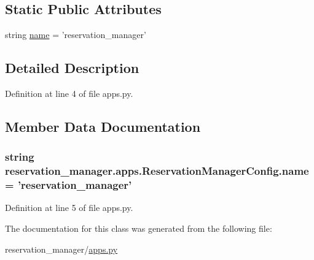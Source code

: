 \subsection*{Static Public Attributes}
\begin{DoxyCompactItemize}
\item 
string \hyperlink{classreservation__manager_1_1apps_1_1ReservationManagerConfig_a4c9b03084ec5d4aab257e52d0f51bf97}{name} = 'reservation\-\_\-manager'
\end{DoxyCompactItemize}


\subsection{Detailed Description}


Definition at line 4 of file apps.\-py.



\subsection{Member Data Documentation}
\hypertarget{classreservation__manager_1_1apps_1_1ReservationManagerConfig_a4c9b03084ec5d4aab257e52d0f51bf97}{
\subsubsection[{name}]{\setlength{\rightskip}{0pt plus 5cm}string reservation\-\_\-manager.\-apps.\-Reservation\-Manager\-Config.\-name = 'reservation\-\_\-manager'\hspace{0.3cm}{\ttfamily [static]}}}\label{classreservation__manager_1_1apps_1_1ReservationManagerConfig_a4c9b03084ec5d4aab257e52d0f51bf97}


Definition at line 5 of file apps.\-py.



The documentation for this class was generated from the following file\-:\begin{DoxyCompactItemize}
\item 
reservation\-\_\-manager/\hyperlink{reservation__manager_2apps_8py}{apps.\-py}\end{DoxyCompactItemize}
